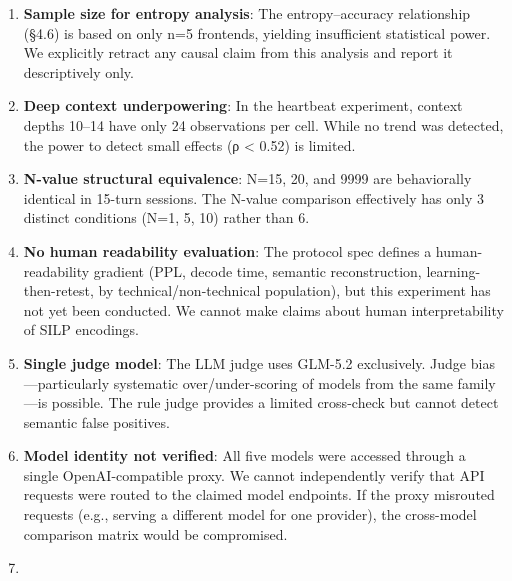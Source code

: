 \begin{enumerate}

\def\labelenumi{\arabic{enumi}.}

\item

  \textbf{Sample size for entropy analysis}: The entropy--accuracy relationship (§4.6) is based on only n=5 frontends, yielding insufficient statistical power. We explicitly retract any causal claim from this analysis and report it descriptively only.

\item

  \textbf{Deep context underpowering}: In the heartbeat experiment, context depths 10--14 have only 24 observations per cell. While no trend was detected, the power to detect small effects (\textbar ρ\textbar{} \textless{} 0.52) is limited.

\item

  \textbf{N-value structural equivalence}: N=15, 20, and 9999 are behaviorally identical in 15-turn sessions. The N-value comparison effectively has only 3 distinct conditions (N=1, 5, 10) rather than 6.

\item

  \textbf{No human readability evaluation}: The protocol spec defines a human-readability gradient (PPL, decode time, semantic reconstruction, learning-then-retest, by technical/non-technical population), but this experiment has not yet been conducted. We cannot make claims about human interpretability of SILP encodings.

\item

  \textbf{Single judge model}: The LLM judge uses GLM-5.2 exclusively. Judge bias---particularly systematic over/under-scoring of models from the same family---is possible. The rule judge provides a limited cross-check but cannot detect semantic false positives.

\item

  \textbf{Model identity not verified}: All five models were accessed through a single OpenAI-compatible proxy. We cannot independently verify that API requests were routed to the claimed model endpoints. If the proxy misrouted requests (e.g., serving a different model for one provider), the cross-model comparison matrix would be compromised.

\item


\end{enumerate}

